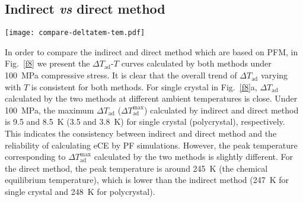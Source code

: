 \documentclass[reprint,3p,sort&compress,times,onecolumn]{elsarticle}
\begin{document}
\subsection{Indirect \textit{vs} direct method}
\begin{figure*}[!t]
\centering
  \texttt{[image: compare-deltatem-tem.pdf]}
  \caption{$\Delta T_{\text{ad}}$-$T$ curves of (a) single crystal and (b) polycrystal calculated by the indirect and direct method under a compressive stress of 100~MPa. The insets show the $\Delta T_{\text{ad}}^{\text{max}}$ as a function of compressive stress.} \label{f8}
\end{figure*}

In order to compare the indirect and direct method which are based on PFM, in Fig.~\ref{f8} we present the $\Delta T_{\text{ad}}$-$T$ curves calculated by both methods under 100~MPa compressive stress. It is clear that the overall trend of $\Delta T_{\text{ad}}$ varying with $T$ is consistent for both methods. For single crystal in Fig.~\ref{f8}a, $\Delta T_{\text{ad}}$ calculated by the two methods at different ambient temperatures is close. Under 100~MPa, the maximum $\Delta T_{\text{ad}}$ ($\Delta T_{\text{ad}}^{\text{max}}$) calculated by indirect and direct method is 9.5 and 8.5~K (3.5 and 3.8~K) for single crystal (polycrystal), respectively. This indicates the consistency between indirect and direct method and the reliability of calculating eCE by PF simulations.
However, the peak temperature corresponding to $\Delta T_{\text{ad}}^{\text{max}}$ calculated by the two methods is slightly different. For the direct method, the peak temperature is around 245~K (the chemical equilibrium temperature), which is lower than the indirect method (247~K for single crystal and 248~K for polycrystal).

\end{document}
